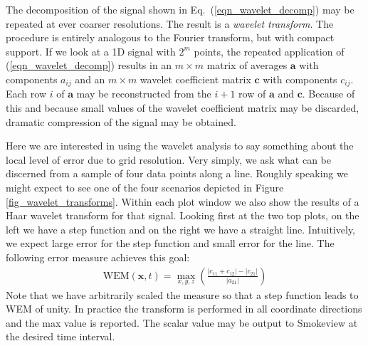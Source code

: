\documentclass[11pt]{book}
\begin{document}
The decomposition of the signal shown in Eq.~(\ref{eqn_wavelet_decomp}) may be repeated at ever coarser resolutions.  The result is a \emph{wavelet transform}. The procedure is entirely analogous to the Fourier transform, but with compact support.  If we look at a 1D signal with $2^m$ points, the repeated application of (\ref{eqn_wavelet_decomp}) results in an $m \times m$ matrix of averages $\mathbf{a}$ with components $a_{ij}$ and an $m \times m$ wavelet coefficient matrix $\mathbf{c}$ with components $c_{ij}$.  Each row $i$ of $\mathbf{a}$ may be reconstructed from the $i+1$ row of $\mathbf{a}$ and $\mathbf{c}$.  Because of this and because small values of the wavelet coefficient matrix may be discarded, dramatic compression of the signal may be obtained.

Here we are interested in using the wavelet analysis to say something about the local level of error due to grid resolution.  Very simply, we ask what can be discerned from a sample of four data points along a line.  Roughly speaking we might expect to see one of the four scenarios depicted in Figure \ref{fig_wavelet_transforms}.  Within each plot window we also show the results of a Haar wavelet transform for that signal.  Looking first at the two top plots, on the left we have a step function and on the right we have a straight line.  Intuitively, we expect large error for the step function and small error for the line.  The following error measure achieves this goal:
\begin{eqnarray}
\mbox{WEM}(\mathbf{x},t) = \max_{x,y,z}\left( \frac{|c_{11} + c_{12}| - |c_{21}|}{|a_{21}|} \right)
\end{eqnarray}
Note that we have arbitrarily scaled the measure so that a step function leads to WEM of unity.  In practice the transform is performed in all coordinate directions and the max value is reported.  The scalar value may be output to Smokeview at the desired time interval.
\end{document}
